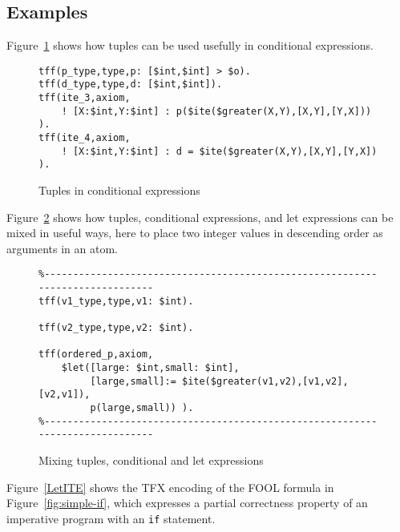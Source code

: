 \documentclass{easychair}
\begin{document}
\subsection{Examples}
\label{Examples}

Figure~\ref{TupleConditional} shows how tuples can be used usefully in 
conditional expressions. 

\begin{figure}[htbp]
\begin{small}
\begin{verbatim}
tff(p_type,type,p: [$int,$int] > $o).
tff(d_type,type,d: [$int,$int]).
tff(ite_3,axiom,
    ! [X:$int,Y:$int] : p($ite($greater(X,Y),[X,Y],[Y,X])) ).
tff(ite_4,axiom,
    ! [X:$int,Y:$int] : d = $ite($greater(X,Y),[X,Y],[Y,X]) ).
\end{verbatim}
\end{small}
\caption{Tuples in conditional expressions}
\label{TupleConditional}
\end{figure}

Figure~\ref{TupleConditionalLet} shows how tuples, conditional expressions, 
and let expressions can be mixed in useful ways, here to place two integer
values in descending order as arguments in an atom.

\begin{figure}[htbp]
\begin{small}
\begin{verbatim}
%------------------------------------------------------------------------------
tff(v1_type,type,v1: $int).

tff(v2_type,type,v2: $int).

tff(ordered_p,axiom,
    $let([large: $int,small: $int],
         [large,small]:= $ite($greater(v1,v2),[v1,v2],[v2,v1]),
         p(large,small)) ).
%------------------------------------------------------------------------------
\end{verbatim}
\end{small}
\caption{Mixing tuples, conditional and let expressions}
\label{TupleConditionalLet}
\end{figure}

Figure~\ref{LetITE} shows the TFX encoding of the FOOL formula in
Figure~\ref{fig:simple-if}, which expresses a partial correctness property 
of an imperative program with an \texttt{if} statement.
\end{document}
